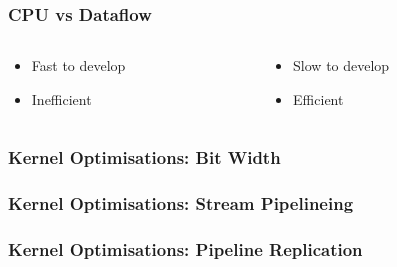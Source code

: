 \begin{frame}
  \frametitle{CPU vs Dataflow}
  \begin{columns}
    \begin{column}{.5\linewidth}
      \begin{figure}[!ht]
        \centering
        \def\svgwidth{\linewidth}
        
      \end{figure}
      \begin{itemize}
      \item Fast to develop
      \item Inefficient
      \end{itemize}
    \end{column}
    \begin{column}{.5\linewidth}
      \begin{figure}[!ht]
        \centering
        \def\svgwidth{\linewidth}
        
      \end{figure}
      \begin{itemize}
      \item Slow to develop
      \item Efficient
      \end{itemize}
    \end{column}
  \end{columns}
\end{frame}

\begin{frame}[fragile]
  \frametitle{Kernel Optimisations: Bit Width}
  \begin{figure}[!ht]
    \centering
    \def\svgwidth{.7\linewidth}
    
  \end{figure}
\end{frame}

\begin{frame}[fragile]
  \frametitle{Kernel Optimisations: Stream Pipelineing}
  \begin{figure}[!ht]
    \centering
    \def\svgwidth{.7\linewidth}
    
  \end{figure}
\end{frame}

\begin{frame}[fragile]
  \frametitle{Kernel Optimisations: Pipeline Replication}
  \begin{figure}[!ht]
    \centering
    \def\svgwidth{.7\linewidth}
    
  \end{figure}
\end{frame}

